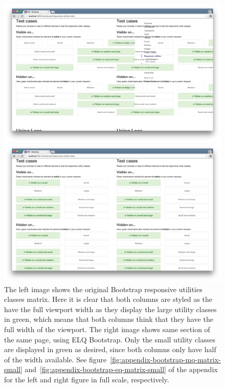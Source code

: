 \documentclass[a4paper,11pt]{kth-mag}
\begin{document}
      \begin{figure}[htb!]
        \centering
        \begin{minipage}{.5\textwidth}
          \centering
          \includegraphics[width=\linewidth]{images/bootstrap-mq-matrix}
        \end{minipage}%
        \begin{minipage}{.5\textwidth}
          \centering
          \includegraphics[width=\linewidth]{images/bootstrap-eq-matrix}
        \end{minipage}
        \caption{
          The left image shows the original \gls{Bootstrap} \gls{responsive} utilities classes matrix.
          Here it is clear that both columns are styled as the have the full \gls{viewport} width as they display the large utility classes in green, which means that both columns think that they have the full width of the \gls{viewport}.
          The right image shows same section of the same page, using \gls{ELQ} \gls{Bootstrap}.
          Only the small utility classes are displayed in green as desired, since both columns only have half of the width available.
          See figure~\ref{fig:appendix-bootstrap-mq-matrix-small} and~\ref{fig:appendix-bootstrap-eq-matrix-small} of the appendix for the left and right figure in full scale, respectively.
        }
        \label{fig:eval-bootstrap-mq-eq-matrix}
      \end{figure}
\end{document}
